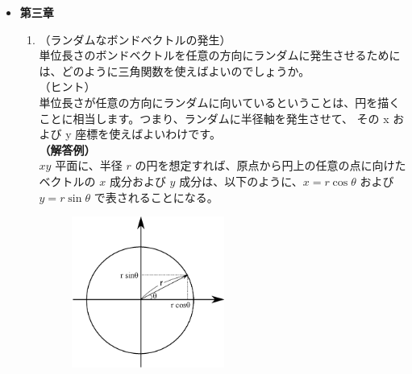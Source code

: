 \documentclass[uplatex,dvipdfmx,a4paper,11pt, titlepage]{jsarticle}
\begin{document}
\begin{itemize}
\begin{enumerate}
	{\bf（解答例）}\\
	活性化エネルギーに対応するエネルギー障壁を乗り越えて状態が遷移していく過程の頻度は、
	系中に存在する粒子の中でその障壁に対応するエネルギーを持っている粒子の存在比率を考えればよいことになる。

	本設問の場合は、基本的な回転振動数（時間の逆数）が与えられているのであるから、系が注目する状態から他の状態（今回の場合は、トランス状態からゴーシュ状態）に遷移する
	緩和時間 $\tau$ の逆数の形で書き下すことができる。
		\begin{align*}
			\dfrac{1}{\tau}
			&= 10^{12} \times \exp \left( -\dfrac{\Delta E}{k_B T} \right) \notag \\[6pt]
			&= 10^{12} \times \exp \left( -\dfrac{15 \times 10^3 {\rm J mol}^{-1} }{1.4 \times 10^{-23} {\rm J K}^{-1} \times 6.02 \times 10^{23} 
			\times 300 {\rm K} } \right) \notag \\[6pt] 
			&\simeq 10^{12} \times \exp \left( -6 \right)\notag \\[6pt]
			&= 10^{12} \times 2.5 \times 10^{-3}\notag \\[6pt]
			&\simeq 10^{9}
			\end{align*}

	したがって、オーダーでみれば、三桁程度頻度が低下するという結論を得ることができる。

	\end{enumerate}

\item
{\bf 第三章}

	\begin{enumerate}
	\item
	\label{it:3-1}
	（ランダムなボンドベクトルの発生）\\
	単位長さのボンドベクトルを任意の方向にランダムに発生させるためには、どのように三角関数を使えばよいのでしょうか。\\
	（ヒント）\\
	単位長さが任意の方向にランダムに向いているということは、円を描くことに相当します。つまり、ランダムに半径軸を発生させて、
	その x および y 座標を使えばよいわけです。\\
	{\bf（解答例）}\\
	$xy$ 平面に、半径 $r$ の円を想定すれば、原点から円上の任意の点に向けたベクトルの $x$ 成分および $y$ 成分は、以下のように、$x = r \cos \theta$ 
	および $y= r \sin \theta$ で表されることになる。
		\begin{figure}[htb]
		\centering
		\includegraphics[width=5cm]{figure/sin_cos.eps}
		\end{figure}


\end{enumerate}
\end{itemize}
\end{document}
